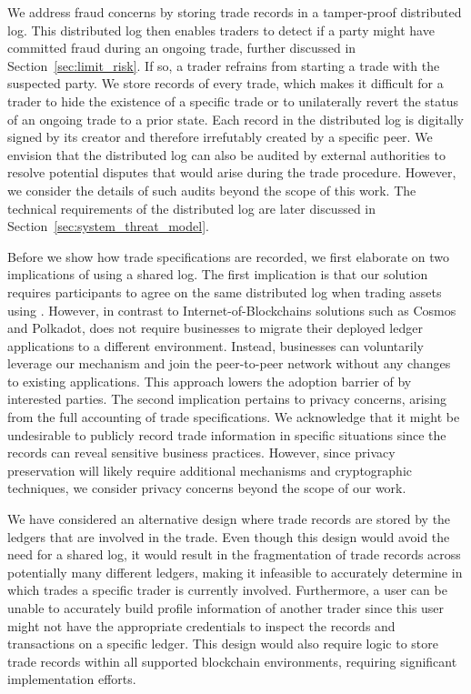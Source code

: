We address fraud concerns by storing trade records in a tamper-proof distributed log.
This distributed log then enables \ModelName{} traders to detect if a party might have committed fraud during an ongoing trade, further discussed in Section~\ref{sec:limit_risk}.
If so, a trader refrains from starting a trade with the suspected party.
We store records of every trade, which makes it difficult for a trader to hide the existence of a specific trade or to unilaterally revert the status of an ongoing trade to a prior state.
Each record in the distributed log is digitally signed by its creator and therefore irrefutably created by a specific peer.
We envision that the distributed log can also be audited by external authorities to resolve potential disputes that would arise during the trade procedure.
However, we consider the details of such audits beyond the scope of this work.
The technical requirements of the distributed log are later discussed in Section~\ref{sec:system_threat_model}.

Before we show how trade specifications are recorded, we first elaborate on two implications of using a shared log.
The first implication is that our solution requires participants to agree on the same distributed log when trading assets using \ModelName{}.
However, in contrast to Internet-of-Blockchains solutions such as Cosmos and Polkadot, \ModelName{} does not require businesses to migrate their deployed ledger applications to a different environment.
Instead, businesses can voluntarily leverage our mechanism and join the \ModelName{} peer-to-peer network without any changes to existing applications.
This approach lowers the adoption barrier of \ModelName{} by interested parties.
The second implication pertains to privacy concerns, arising from the full accounting of trade specifications.
We acknowledge that it might be undesirable to publicly record trade information in specific situations since the records can reveal sensitive business practices.
However, since privacy preservation will likely require additional mechanisms and cryptographic techniques, we consider privacy concerns beyond the scope of our work.

We have considered an alternative design where trade records are stored by the ledgers that are involved in the trade.
Even though this design would avoid the need for a shared log, it would result in the fragmentation of trade records across potentially many different ledgers, making it infeasible to accurately determine in which trades a specific trader is currently involved.
Furthermore, a user can be unable to accurately build profile information of another trader since this user might not have the appropriate credentials to inspect the records and transactions on a specific ledger.
This design would also require logic to store \ModelName{} trade records within all supported blockchain environments, requiring significant implementation efforts.

